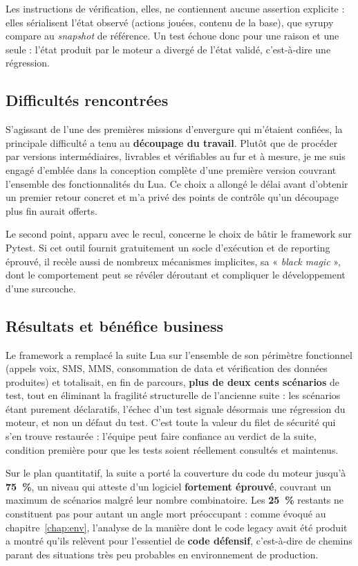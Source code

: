 Les instructions de vérification, elles, ne
contiennent aucune assertion explicite : elles sérialisent l'état observé
(actions jouées, contenu de la base), que syrupy compare au \emph{snapshot}
de référence. Un test échoue donc pour une raison et une seule : l'état
produit par le moteur a divergé de l'état validé, c'est-à-dire une
régression.

\subsection{Difficultés rencontrées}
S'agissant de l'une des premières missions d'envergure qui m'étaient confiées,
la principale difficulté a tenu au \textbf{découpage du travail}. Plutôt que de
procéder par versions intermédiaires, livrables et vérifiables au fur et à
mesure, je me suis engagé d'emblée dans la conception complète d'une première
version couvrant l'ensemble des fonctionnalités du Lua. Ce choix a allongé le
délai avant d'obtenir un premier retour concret et m'a privé des points de
contrôle qu'un découpage plus fin aurait offerts.

Le second point, apparu avec le recul, concerne le choix de bâtir le framework
sur Pytest. Si cet outil fournit gratuitement un socle d'exécution et de
reporting éprouvé, il recèle aussi de nombreux mécanismes implicites, sa
« \emph{black magic} », dont le comportement peut se révéler déroutant et
compliquer le développement d'une surcouche.

\subsection{Résultats et bénéfice business}
Le framework a remplacé la suite Lua sur l'ensemble de son périmètre
fonctionnel (appels voix, SMS, MMS, consommation de data et vérification des
données produites) et totalisait, en fin de parcours, \textbf{plus de deux
cents scénarios} de test, tout en éliminant la fragilité structurelle de
l'ancienne suite : les scénarios étant purement déclaratifs, l'échec d'un test
signale désormais une régression du moteur, et non un défaut du test. C'est toute la valeur du
filet de sécurité qui s'en trouve restaurée : l'équipe peut faire confiance
au verdict de la suite, condition première pour que les tests soient
réellement consultés et maintenus.

Sur le plan quantitatif, la suite a porté la \gls{couverture}
du code du moteur jusqu'à \textbf{75~\%}, un niveau qui atteste d'un logiciel
\textbf{fortement éprouvé}, couvrant un maximum de scénarios malgré leur nombre
combinatoire. Les \textbf{25~\%} restants ne constituent pas pour autant un angle
mort préoccupant : comme évoqué au chapitre~\ref{chap:env}, l'analyse de la
manière dont le code legacy avait été produit a montré qu'ils relèvent pour
l'essentiel de \textbf{code défensif}, c'est-à-dire de chemins parant des
situations très peu probables en environnement de production.

